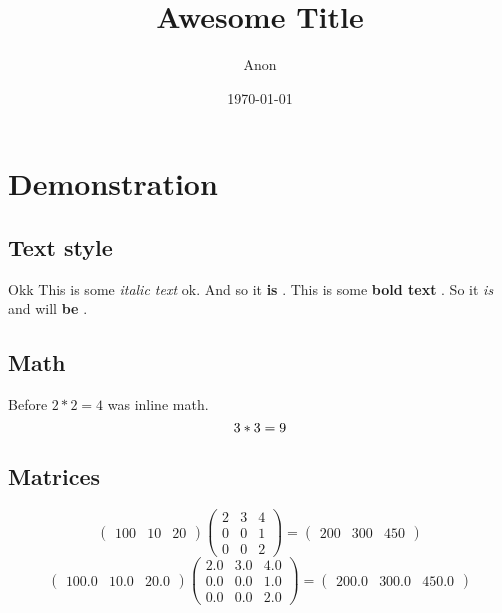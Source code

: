 \documentclass[titlepage]{article}%
\title{Awesome Title}%
\author{Anon}%
\date{\today}%
\begin{document}
%
\normalsize%
\maketitle%
%
\section{Demonstration}%
\label{sec:Demonstration}%

%
\subsection{Text style}%
\label{subsec:Textstyle}%

%
%
Okk%
%
This is some %
\textit{italic text}%
\hspace{1pt} %
 ok. And so it %
\textbf{is}%
.%
\newline%
%
This is some %
\textbf{bold text}%
. So it %
\textit{is}%
\hspace{1pt} %
 and will %
\textbf{be}%
. %
%
\subsection{Math}%
\label{subsec:Math}%

%
%
Before %
$2*2 = 4$%
\hspace{1pt} %
 was inline math.%
\[%
3*3 = 9\newline%
%
\]%
%
\subsection{Matrices}%
\label{subsec:Matrices}%

%
%
\[%
\begin{pmatrix}%
100&10&20%
\end{pmatrix} \begin{pmatrix}%
2&3&4\\%
0&0&1\\%
0&0&2%
\end{pmatrix} = \begin{pmatrix}%
200&300&450%
\end{pmatrix}%
\]%
\[%
\begin{pmatrix}%
100.0&10.0&20.0%
\end{pmatrix} \begin{pmatrix}%
2.0&3.0&4.0\\%
0.0&0.0&1.0\\%
0.0&0.0&2.0%
\end{pmatrix} = \begin{pmatrix}%
200.0&300.0&450.0%
\end{pmatrix}%
\]%
\end{document}

